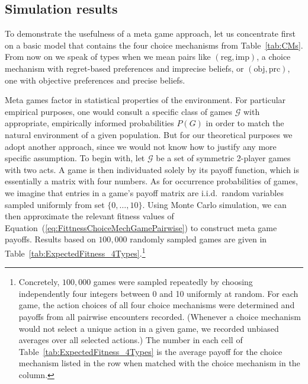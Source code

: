 \documentclass[fleqn,reqno,11pt]{article}
\begin{document}
\subsection{Simulation results}
\label{sec:simulation-results}

To demonstrate the usefulness of a meta game approach, let us concentrate first on a basic
model that contains the four choice mechanisms from Table~\ref{tab:CMs}. From now on we speak
of types when we mean pairs like $(\text{reg}, \text{imp})$, a choice mechanism with
regret-based preferences and imprecise beliefs, or $(\text{obj}, \text{prc})$, one with
objective preferences and precise beliefs.

Meta games factor in statistical properties of the environment. For particular empirical
purposes, one would consult a specific class of games $\mathcal{G}$ with appropriate,
empirically informed probabilities $P(G)$ in order to match the natural environment of a given
population. But for our theoretical purposes we adopt another approach, since we would not know
how to justify any more specific assumption. To begin with, let $\mathcal{G}$ be a set of
symmetric 2-player games with two acts. A game is then individuated solely by its payoff
function, which is essentially a matrix with four numbers. As for occurrence probabilities of
games, we imagine that entries in a game's payoff matrix are i.i.d.~random variables sampled
uniformly from set $ \lbrace 0, \dots, 10 \rbrace$.  Using Monte Carlo simulation, we can then
approximate the relevant fitness values of Equation~(\ref{eq:FittnessChoiceMechGamePairwise})
to construct meta game payoffs. Results based on $100,000$ randomly sampled games are given in
Table~\ref{tab:ExpectedFitness_4Types}.\footnote{Concretely, $100,000$ games were sampled
  repeatedly by choosing independently four integers between 0 and 10 uniformly at random. For
  each game, the action choices of all four choice mechanisms were determined and payoffs from
  all pairwise encounters recorded. (Whenever a choice mechanism would not select a unique
  action in a given game, we recorded unbiased averages over all selected actions.)  The number
  in each cell of Table~\ref{tab:ExpectedFitness_4Types} is the average payoff for the choice
  mechanism listed in the row when matched with the choice mechanism in the column.}
\end{document}
